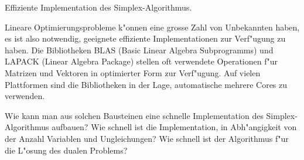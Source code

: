 \begin{aufgabe}
Effiziente Implementation des Simplex-Algorithmus.
\end{aufgabe}

Lineare Optimierungsprobleme  k"onnen eine grosse Zahl von Unbekannten
haben, es ist also notwendig, geeignete effiziente Implementationen
zur Verf"ugung zu haben. Die Bibliotheken BLAS (Basic Linear
Algebra Subprogramms) und LAPACK (Linear Algebra Package) stellen
oft verwendete Operationen f"ur Matrizen und Vektoren in
optimierter Form zur Verf"ugung. Auf vielen Plattformen sind die
Bibliotheken in der Lage, automatische mehrere Cores zu verwenden.

Wie kann man aus solchen Bausteinen eine schnelle Implementation
des Simplex-Algorithmus aufbauen? Wie schnell ist die Implementation,
in Abh"angigkeit von der Anzahl Variablen und Ungleichungen?
Wie schnell ist der Algorithmus f"ur die L"osung des dualen Problems?

